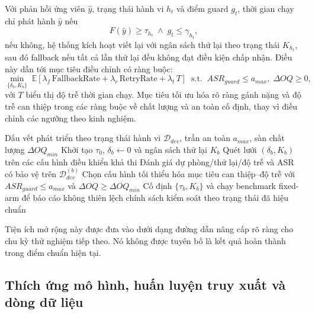 ﻿\documentclass[a4paper,12pt]{article}
\begin{document}
Với phản hồi ứng viên \(\hat{y}\), trạng thái hành vi \(h_t\) và điểm guard \(g_t\), thời gian chạy chỉ phát hành \(\hat{y}\) nếu
\begin{equation}
F(\hat{y})\ge \tau_{h_t}\;\land\; g_t\le \gamma_{h_t},
\end{equation}
nếu không, hệ thống kích hoạt viết lại với ngân sách thử lại theo trạng thái \(K_{h_t}\), sau đó fallback nếu tất cả lần thử lại đều không đạt điều kiện chấp nhận. Điều này dẫn tới mục tiêu điều chỉnh có ràng buộc:
\begin{equation}
\min_{\{\delta_b,K_b\}} \;\mathbb{E}\!\left[\lambda_f\,\mathrm{FallbackRate}+\lambda_r\,\mathrm{RetryRate}+\lambda_t\,T\right]
\;\;\text{s.t.}\;\; ASR_{guard}\le a_{max},\; \Delta OQ\ge 0,
\end{equation}
với \(T\) biểu thị độ trễ thời gian chạy. Mục tiêu tối ưu hóa rõ ràng gánh nặng và độ trễ can thiệp trong các ràng buộc về chất lượng và an toàn cố định, thay vì điều chỉnh các ngưỡng theo kinh nghiệm.

\begin{algorithm}[H]
\caption{Hiệu chuẩn ngưỡng điều khiển theo trạng thái}
\begin{algorithmic}[1]
\Require Dấu vết phát triển theo trạng thái hành vi \(\mathcal{D}_{dev}\), trần an toàn \(a_{max}\), sàn chất lượng \(\Delta OQ_{min}\)
\State Khởi tạo \(\tau_0\), \(\delta_b\gets0\) và ngân sách thử lại \(K_b\)
  \State Quét lưới \((\delta_b,K_b)\) trên các cấu hình điều khiển khả thi
  \State Đánh giá dự phòng/thử lại/độ trễ và ASR có bảo vệ trên \(\mathcal{D}_{dev}^{(b)}\)
  \State Chọn cấu hình tối thiểu hóa mục tiêu can thiệp--độ trễ với \(ASR_{guard}\le a_{max}\) và \(\Delta OQ\ge \Delta OQ_{min}\)
\EndFor
\State Cố định \(\{\tau_b,K_b\}\) và chạy benchmark fixed-arm để báo cáo không thiên lệch
\State \Return chính sách kiểm soát theo trạng thái đã hiệu chuẩn
\end{algorithmic}
\end{algorithm}

Tiện ích mở rộng này được đưa vào dưới dạng đường dẫn nâng cấp rõ ràng cho chu kỳ thử nghiệm tiếp theo. Nó không được tuyên bố là kết quả hoàn thành trong điểm chuẩn hiện tại.

\subsection{Thích ứng mô hình, huấn luyện truy xuất và dòng dữ liệu}
\end{document}
